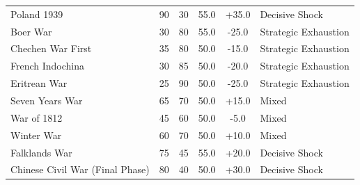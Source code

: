 \begin{table}[ht]
\begin{tabularx}{\textwidth}{l c c c c X}
    Poland 1939 & 90 & 30 & 55.0 & +35.0 & Decisive Shock \\
    Boer War & 30 & 80 & 55.0 & -25.0 & Strategic Exhaustion \\
    Chechen War First & 35 & 80 & 50.0 & -15.0 & Strategic Exhaustion \\
    French Indochina & 30 & 85 & 50.0 & -20.0 & Strategic Exhaustion \\
    Eritrean War & 25 & 90 & 50.0 & -25.0 & Strategic Exhaustion \\
    Seven Years War & 65 & 70 & 50.0 & +15.0 & Mixed \\
    War of 1812 & 45 & 60 & 50.0 & -5.0 & Mixed \\
    Winter War & 60 & 70 & 50.0 & +10.0 & Mixed \\
    Falklands War & 75 & 45 & 55.0 & +20.0 & Decisive Shock \\
    Chinese Civil War (Final Phase) & 80 & 40 & 50.0 & +30.0 & Decisive Shock \\
\bottomrule
\end{tabularx}
\end{table}
